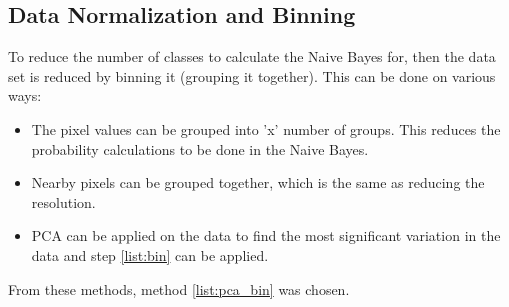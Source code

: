 \subsection{Data Normalization and Binning}

To reduce the number of classes to calculate the Naive Bayes for, then the data set is reduced by binning it (grouping it together).
This can be done on various ways:

\begin{itemize}
\item The pixel values can be grouped into 'x' number of groups.
This reduces the probability calculations to be done in the Naive Bayes. \label{list:bin}
\item Nearby pixels can be grouped together, which is the same as reducing the resolution.
\item PCA can be applied on the data to find the most significant variation in the data and step \ref{list:bin} can be applied. \label{list:pca_bin}
\end{itemize}

From these methods, method \ref{list:pca_bin} was chosen.

